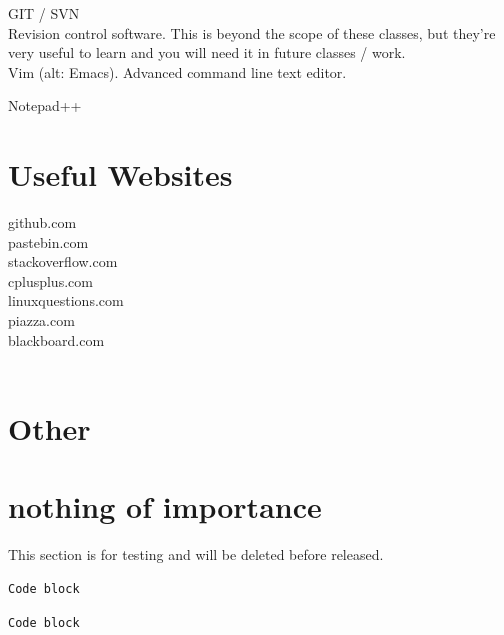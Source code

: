 \documentclass[letterpaper,10pt,titlepage,fleqn]{article}
\begin{document}
GIT / SVN \\
Revision control software. This is beyond the scope of these classes, but
they’re very useful to learn and you will need it in future classes / work.\\

Vim (alt: Emacs).
Advanced command line text editor.

Notepad++


\section{Useful Websites}

github.com\\
pastebin.com\\
stackoverflow.com\\
cplusplus.com\\
linuxquestions.com\\
piazza.com\\
blackboard.com\\
\\

\section{Other}


\section{nothing of importance}

This section is for testing and will be deleted before released.

\begin{lstlisting}[frame=trBL]
Code block
\end{lstlisting}

\begin{lstlisting}[frame=single, framerule=0pt]
Code block
\end{lstlisting}
\end{document}
